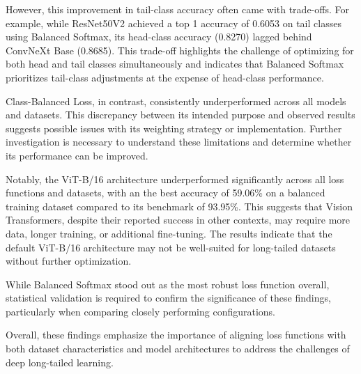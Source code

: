 However, this improvement in tail-class accuracy often came with trade-offs. For example, while ResNet50V2 achieved a top 1 accuracy of 0.6053 on tail classes using Balanced Softmax, its head-class accuracy (0.8270) lagged behind ConvNeXt Base (0.8685). This trade-off highlights the challenge of optimizing for both head and tail classes simultaneously and indicates that Balanced Softmax prioritizes tail-class adjustments at the expense of head-class performance. 

Class-Balanced Loss, in contrast, consistently underperformed across all models and datasets. This discrepancy between its intended purpose and observed results suggests possible issues with its weighting strategy or implementation. Further investigation is necessary to understand these limitations and determine whether its performance can be improved.

Notably, the ViT-B/16 architecture underperformed significantly across all loss functions and datasets, with an the best accuracy of 59.06\% on a balanced training dataset compared to its benchmark of 93.95\%. This suggests that Vision Transformers, despite their reported success in other contexts, may require more data, longer training, or additional fine-tuning. The results indicate that the default ViT-B/16 architecture may not be well-suited for long-tailed datasets without further optimization.

While Balanced Softmax stood out as the most robust loss function overall, statistical validation is required to confirm the significance of these findings, particularly when comparing closely performing configurations. %

Overall, these findings emphasize the importance of aligning loss functions with both dataset characteristics and model architectures to address the challenges of deep long-tailed learning. %